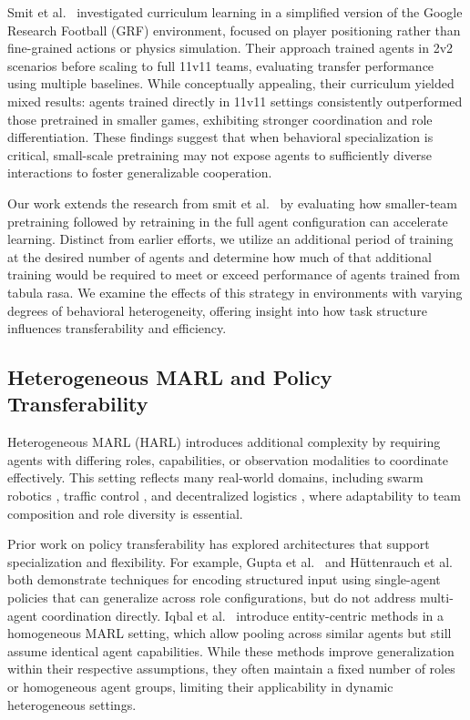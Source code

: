 Smit et al.~\cite{smit2023} investigated curriculum learning in a simplified version of the 
Google Research Football (GRF) environment, focused on player positioning rather than 
fine-grained actions or physics simulation. Their approach trained agents in 2v2 scenarios 
before scaling to full 11v11 teams, evaluating transfer performance using multiple baselines. 
While conceptually appealing, their curriculum yielded mixed results: agents trained directly 
in 11v11 settings consistently outperformed those pretrained in smaller games, exhibiting 
stronger coordination and role differentiation. These findings suggest that when behavioral 
specialization is critical, small-scale pretraining may not expose agents to sufficiently 
diverse interactions to foster generalizable cooperation.

Our work extends the research from smit et al.~\cite{smit2023}
by evaluating how smaller-team pretraining followed 
by retraining in the full agent configuration can accelerate learning. 
Distinct from earlier efforts, we utilize an additional period of training at 
the desired number of agents and determine how much of that additional training would 
be required to meet or exceed performance of agents trained from tabula rasa.
We examine the effects of this strategy in environments with varying degrees of 
behavioral heterogeneity, offering insight into how task structure influences 
transferability and efficiency.

\subsection{Heterogeneous MARL and Policy Transferability}

Heterogeneous MARL (HARL) introduces additional complexity by requiring agents with 
differing roles, capabilities, or observation modalities to coordinate effectively. 
This setting reflects many real-world domains, including swarm robotics \cite{hoang2023}, 
traffic control \cite{calvo2018}, and decentralized logistics \cite{rizk2019}, 
where adaptability to team composition and role diversity is essential.

Prior work on policy transferability has explored architectures that support specialization 
and flexibility. For example, Gupta et al.~\cite{gupta2017a} and H{\"u}ttenrauch 
et al.~\cite{huttenrauch2019} both demonstrate techniques for encoding structured input 
using single-agent policies that can generalize across role configurations, but do not 
address multi-agent coordination directly. Iqbal et al.~\cite{iqbal2021} introduce 
entity-centric methods in a homogeneous MARL setting, which allow pooling across similar 
agents but still assume identical agent capabilities. While these methods improve 
generalization within their respective assumptions, they often maintain a fixed number of roles 
or homogeneous agent groups, limiting their applicability in dynamic heterogeneous settings.


